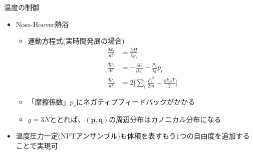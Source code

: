 \documentclass[dvipdfmx]{beamer}
\begin{document}
\begin{frame}[t,fragile]{温度の制御}
  \begin{itemize}
  \item Nose-Hoover熱浴
    \begin{itemize}
    \item 運動方程式(実時間発展の場合)
      \begin{align*}
        \frac{dx_i}{dt} &= \frac{\partial H}{\partial p_i} \\
        \frac{dp_i}{dt} &= -\frac{\partial U}{\partial x_i} -\frac{p_s}{Q} p_i \\
        \frac{dp_s}{dt} &= 2 \big[ \sum_i \frac{{p_i}^2}{2m} - \frac{g k_B T}{2} \big]
      \end{align*}
    \item 「摩擦係数」$p_s$にネガティブフィードバックがかかる
    \item $g=3N$ととれば、$(\mathbf{p},\mathbf{q})$の周辺分布はカノニカル分布になる
    \end{itemize}
    \item 温度圧力一定(NPTアンサンブル)も体積を表すもう1つの自由度を追加することで実現可
  \end{itemize}
\end{frame}
\end{document}

